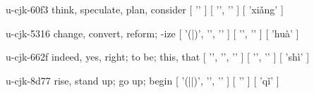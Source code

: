 \begin{multicols}{2}
\lettrine[lines=3]{\cjkgGlue{}}{}\begin{minipage}{0.8\linewidth} u-cjk-60f3  think, speculate, plan, consider  [ '\cjkgGlue{}' ]  [ '\cjkgGlue{}', '\cjkgGlue{}' ]  [ 'xiǎng' ] \end{minipage}

\lettrine[lines=3]{\cjkgGlue{}}{}\begin{minipage}{0.8\linewidth} u-cjk-5316  change, convert, reform; -ize  [ '\cjkgGlue{}(\cjkgGlue{}|\cjkgGlue{})', '\cjkgGlue{}', '\cjkgGlue{}' ]  [ '\cjkgGlue{}', '\cjkgGlue{}' ]  [ 'huà' ] \end{minipage}

\lettrine[lines=3]{\cjkgGlue{}}{}\begin{minipage}{0.8\linewidth} u-cjk-662f  indeed, yes, right; to be; this, that  [ '\cjkgGlue{}', '\cjkgGlue{}', '\cjkgGlue{}' ]  [ '\cjkgGlue{}', '\cjkgGlue{}' ]  [ 'shì' ] \end{minipage}

\lettrine[lines=3]{\cjkgGlue{}}{}\begin{minipage}{0.8\linewidth} u-cjk-8d77  rise, stand up; go up; begin  [ '\cjkgGlue{}(\cjkgGlue{}|\cjkgGlue{}|\cjkgGlue{})', '\cjkgGlue{}', '\cjkgGlue{}' ]  [ '\cjkgGlue{}' ]  [ 'qǐ' ] \end{minipage}



\end{multicols}



